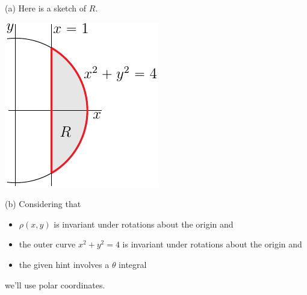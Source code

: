 \begin{solution}
(a) Here is a sketch of $R$.
\begin{center}
     \includegraphics{fig/OE08D_7.pdf}
\end{center}

(b) Considering that
\begin{itemize}
\item
$\rho(x,y)$ is invariant under rotations about the origin and
\item
the outer curve $x^2+y^2=4$  is invariant under rotations about the origin and
\item
the given hint involves a $\theta$ integral
\end{itemize}
we'll use polar coordinates. 


\end{solution}
